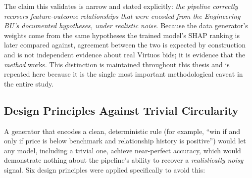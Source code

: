 The claim this validates is narrow and stated explicitly: \emph{the
pipeline correctly recovers feature-outcome relationships that were
encoded from the Engineering BU's documented hypotheses, under realistic
noise}. Because the data generator's weights come from the same
hypotheses the trained model's SHAP ranking is later compared against,
agreement between the two is expected by construction and is not
independent evidence about real Virtuos bids; it is evidence that the
\emph{method} works. This distinction is maintained throughout this
thesis and is repeated here because it is the single most important
methodological caveat in the entire study.

\hypertarget{design-principles-against-trivial-circularity}{%
\subsection{Design Principles Against Trivial
Circularity}\label{design-principles-against-trivial-circularity}}

A generator that encodes a clean, deterministic rule (for example, ``win
if and only if price is below benchmark and relationship history is
positive'') would let any model, including a trivial one, achieve
near-perfect accuracy, which would demonstrate nothing about the
pipeline's ability to recover a \emph{realistically noisy} signal. Six
design principles were applied specifically to avoid this:


